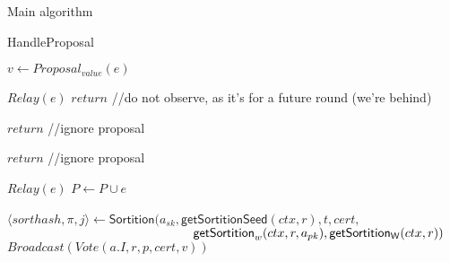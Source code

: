 \documentclass[10pt,a4paper]{article}
\begin{document}
\begin{section}{Main algorithm}


\begin{subsection}{HandleProposal}\label{ssect:HandleProposal}

    \begin{algorithm}[H]
        \begin{algorithmic}[1]

            \State $v \gets Proposal_{value}(e)$

                \State $Relay(e)$
                \State $return$  //do not observe, as it's for a future round (we're behind)
            \EndIf

                \State $return$  //ignore proposal
            \EndIf

                \State $return$ //ignore proposal
            \EndIf

            \State $Relay(e)$
            \State $P \gets P \cup e$

                    \State $\langle sorthash, \pi, j\rangle\gets 
                    \mathsf{Sortition}(
                    a_{sk}, 
                    \mathsf{getSortitionSeed}(ctx, r), 
                    t, 
                    cert, $ \newline
                    ${}$ ${\hskip 5.2cm}\mathsf{getSortition}_w(ctx, r, a_{pk}), 
                    \mathsf{getSortition_W}(ctx, r)
                    )$
                        \State $Broadcast(Vote(a.I, r, p, cert, v))$
                    \EndIf
                \EndFor    
            \EndIf

        \EndFunction
        \end{algorithmic}
        \caption{\underline{HandleProposal}}
    \end{algorithm}
    

\end{subsection}
\end{section}
\end{document}
